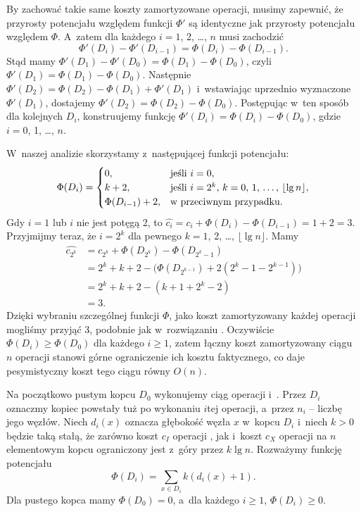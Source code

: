 
\exercise %
By zachować takie same koszty zamortyzowane operacji, musimy zapewnić, że przyrosty potencjału względem funkcji $\Phi'$ są identyczne jak przyrosty potencjału względem $\Phi$.
A~zatem dla każdego $i=1$, 2, \dots, $n$ musi zachodzić
\[
	\Phi'(D_i)-\Phi'(D_{i-1}) = \Phi(D_i)-\Phi(D_{i-1}).
\]
Stąd mamy $\Phi'(D_1)-\Phi'(D_0)=\Phi(D_1)-\Phi(D_0)$, czyli $\Phi'(D_1)=\Phi(D_1)-\Phi(D_0)$.
Następnie $\Phi'(D_2)=\Phi(D_2)-\Phi(D_1)+\Phi'(D_1)$ i~wstawiając uprzednio wyznaczone $\Phi'(D_1)$, dostajemy $\Phi'(D_2)=\Phi(D_2)-\Phi(D_0)$.
Postępując w~ten sposób dla kolejnych $D_i$, konstruujemy funkcję $\Phi'(D_i)=\Phi(D_i)-\Phi(D_0)$, gdzie $i=0$, 1, \dots, $n$.

\exercise %
W~naszej analizie skorzystamy z~następującej funkcji potencjału:
\[
	\Phi(D_i) = \begin{cases}
		0, & \text{jeśli $i=0$}, \\
		k+2, & \text{jeśli $i=2^k$, $k=0$, 1, \dots, $\lfloor\lg n\rfloor$}, \\
		\Phi(D_{i-1})+2, & \text{w~przeciwnym przypadku}.
	\end{cases}
\]
Gdy $i=1$ lub $i$ nie jest potęgą 2, to $\widehat{c_i}=c_i+\Phi(D_i)-\Phi(D_{i-1})=1+2=3$.
Przyjmijmy teraz, że $i=2^k$ dla pewnego $k=1$, 2, \dots, $\lfloor\lg n\rfloor$.
Mamy
\begin{align*}
	\widehat{c_{2^k}} &= c_{2^k}+\Phi(D_{2^k})-\Phi(D_{2^k-1}) \\
	&= 2^k+k+2-\bigl(\Phi(D_{2^{k-1}})+2(2^k-1-2^{k-1})\bigr) \\
	&= 2^k+k+2-(k+1+2^k-2) \\
	&= 3.
\end{align*}
Dzięki wybraniu szczególnej funkcji $\Phi$, jako koszt zamortyzowany każdej operacji mogliśmy przyjąć 3, podobnie jak w~rozwiązaniu .
Oczywiście $\Phi(D_i)\ge\Phi(D_0)$ dla każdego $i\ge1$, zatem łączny koszt zamortyzowany ciągu $n$ operacji stanowi górne ograniczenie ich kosztu faktycznego, co daje pesymistyczny koszt tego ciągu równy $O(n)$.

\exercise %
Na początkowo pustym kopcu $D_0$ wykonujemy ciąg operacji  i~.
Przez $D_i$ oznaczmy kopiec powstały tuż po wykonaniu $i$\nbhyphen tej operacji, a~przez $n_i$ -- liczbę jego węzłów.
Niech $d_i(x)$ oznacza głębokość węzła $x$ w~kopcu $D_i$ i~niech $k>0$ będzie taką stałą, że zarówno koszt $c_I$ operacji , jak i~koszt $c_X$ operacji  na $n$\nbhyphen elementowym kopcu ograniczony jest z~góry przez $k\lg n$.
Rozważymy funkcję potencjału
\[
	\Phi(D_i) = \sum_{x\in D_i}k(d_i(x)+1).
\]
Dla pustego kopca mamy $\Phi(D_0)=0$, a~dla każdego $i\ge1$, $\Phi(D_i)\ge0$.

